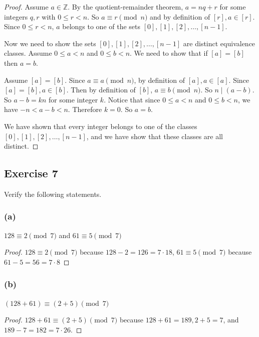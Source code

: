 \documentclass[14pt]{extarticle}
\newcommand{\Z}{\mathbb{Z}}
\begin{document}
\begin{proof}
        Assume \(a \in \Z\). By the quotient-remainder theorem, \(a = nq + r\) for some integers \(q,r\) with \(0 \leq r < n\).
        So \(a \equiv r \pmod n\) and by definition of \([r], a \in [r]\). Since \(0 \leq r < n\), $a$ belongs to one of the
        sets \([0], [1], [2], \ldots, [n - 1]\).

        Now we need to show the sets \([0], [1], [2], \ldots, [n - 1]\) are distinct equivalence classes. Assume \(0\leq a<n\)
        and \(0 \leq b < n\). We need to show that if \([a] = [b]\) then \(a = b\).

        Assume \([a] = [b]\). Since \(a \equiv a \pmod n\), by definition of \([a], a \in [a]\). Since \([a] = [b], a \in [b]\). Then by definition of \([b]\), \(a \equiv b \pmod n\). So \(n \mid (a-b)\). So \(a-b = kn\) for some integer $k$. Notice that since \(0\leq a < n\) and \(0 \leq b < n\), we have \(-n < a-b < n\). Therefore $k=0$. So $a=b$.

        We have shown that every integer belongs to one of the classes \([0], [1], [2], \ldots, [n-1]\), and we have show
        that these classes are all distinct.
\end{proof}

\subsection{Exercise 7}
Verify the following statements.

\subsubsection{(a)}
\(128 \equiv 2 \pmod 7\) and \(61 \equiv 5 \pmod 7\)

\begin{proof}
        \(128 \equiv 2 \pmod 7\) because \(128 - 2 = 126 = 7 \cdot 18\),
        \(61 \equiv 5 \pmod 7\) because \(61 - 5 = 56 = 7 \cdot 8\)
\end{proof}

\subsubsection{(b)}
\((128 + 61) \equiv (2 + 5) \pmod 7\)

\begin{proof}
        \(128 + 61 \equiv (2 + 5) \pmod 7\) because \(128 + 61 = 189, 2 + 5 = 7\), and \(189 - 7 = 182 = 7 \cdot 26\).
\end{proof}
\end{document}
